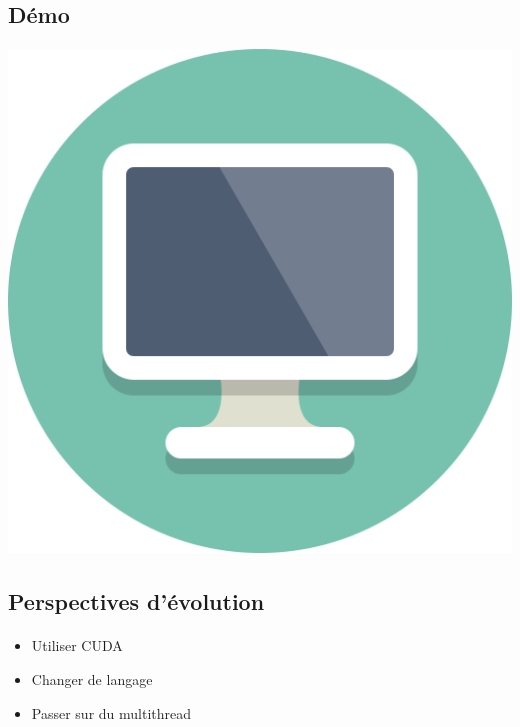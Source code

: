 \subsection{Démo}

\begin{frame}[fragile=singleslide]{\insertsectionhead}
  \framesubtitle{\insertsubsectionhead}
  \begin{center}
      \includegraphics[scale=0.17]{resources/demo.png}
  \end{center}
\end{frame}

\subsection{Perspectives d'évolution}

\begin{frame}[fragile=singleslide]{\insertsectionhead}
  \framesubtitle{\insertsubsectionhead}
  \begin{itemize}
    \item Utiliser CUDA
  \end{itemize}
  \hfill
  \begin{itemize}
    \item Changer de langage
  \end{itemize}
  \hfill
  \begin{itemize}
    \item Passer sur du multithread
  \end{itemize}
\end{frame}

